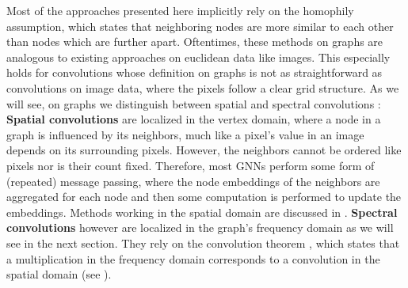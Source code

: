 \documentclass{article}
\begin{document}
Most of the approaches presented here implicitly rely on the homophily assumption, which states that neighboring nodes are more similar to each other than nodes which are further apart. Oftentimes, these methods on graphs are analogous to existing approaches on euclidean data like images.
This especially holds for convolutions \cite{he2016deep} whose definition on graphs is not as straightforward as convolutions on image data, where the pixels follow a clear grid structure.
As we will see, on graphs we distinguish between spatial and spectral convolutions \cite{bruna2014spectral}: 
\textbf{Spatial convolutions} are localized in the vertex domain, where a node in a graph is influenced by its neighbors, much like a pixel's value in an image depends on its surrounding pixels. However, the neighbors cannot be ordered like pixels nor is their count fixed. Therefore, most GNNs perform some form of (repeated) message passing, where the node embeddings of the neighbors are aggregated for each node and then some computation is performed to update the embeddings. Methods working in the spatial domain are discussed in . 
 \textbf{Spectral convolutions} however are localized in the graph's frequency domain as we will see in the next section. They rely on the convolution theorem%
 , which states that a multiplication in the frequency domain corresponds to a convolution in the spatial domain (see ).



\end{document}
